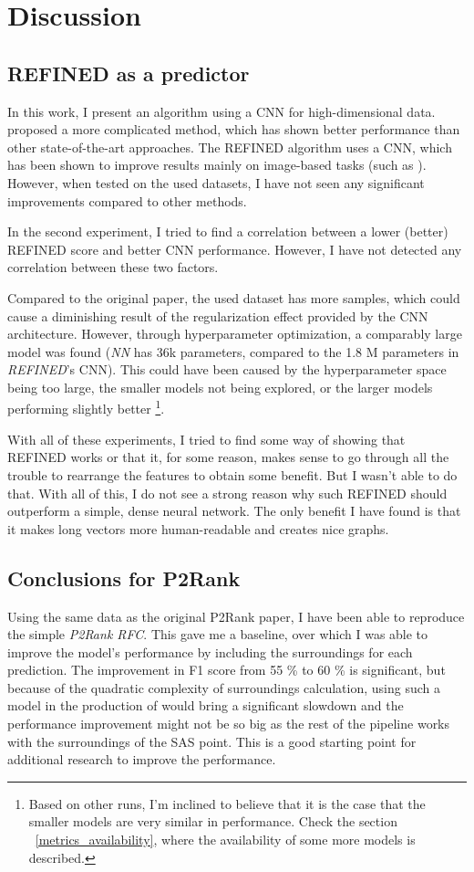 \chapter{Discussion}

\section{REFINED as a predictor}
In this work, I present an algorithm using a CNN for high-dimensional data. \cite{REFINED} proposed a more complicated method, which has shown better performance than other state-of-the-art approaches. The REFINED algorithm uses a CNN, which has been shown to improve results mainly on image-based tasks (such as \cite{AlexNet}). However, when tested on the used datasets, I have not seen any significant improvements compared to other methods.

In the second experiment, I tried to find a correlation between a lower (better) REFINED score and better CNN performance. However, I have not detected any correlation between these two factors.

Compared to the original paper, the used dataset has more samples, which could cause a diminishing result of the regularization effect provided by the CNN architecture. However, through hyperparameter optimization, a comparably large model was found (\textit{NN} has 36k parameters, compared to the 1.8 M parameters in \textit{REFINED}'s CNN). This could have been caused by the hyperparameter space being too large, the smaller models not being explored, or the larger models performing slightly better \footnote{Based on other runs, I'm inclined to believe that it is the case that the smaller models are very similar in performance. Check the section ~\ref{metrics_availability}, where the availability of some more models is described.}.

With all of these experiments, I tried to find some way of showing that REFINED works or that it, for some reason, makes sense to go through all the trouble to rearrange the features to obtain some benefit. But I wasn't able to do that. With all of this, I do not see a strong reason why such REFINED should outperform a simple, dense neural network. The only benefit I have found is that it makes long vectors more human-readable and creates nice graphs.

\section{Conclusions for P2Rank}

Using the same data as the original P2Rank paper, I have been able to reproduce the simple \textit{P2Rank RFC}. This gave me a baseline, over which I was able to improve the model's performance by including the surroundings for each prediction. The improvement in F1 score from 55 \% to 60 \% is significant, but because of the quadratic complexity of surroundings calculation, using such a model in the production of \cite{prankweb} would bring a significant slowdown and the performance improvement might not be so big as the rest of the pipeline works with the surroundings of the SAS point. This is a good starting point for additional research to improve the performance.